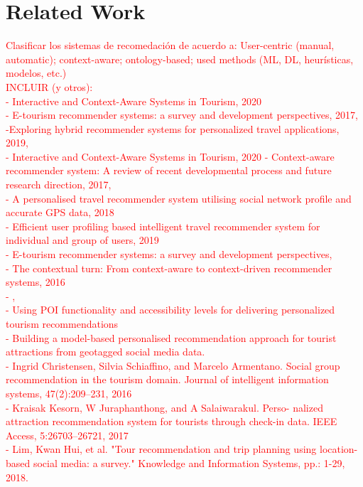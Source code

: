 \section{Related Work}

\textcolor{red}{Clasificar los sistemas de recomedación de acuerdo a: User-centric (manual, automatic); context-aware; ontology-based; used methods (ML, DL, heurísticas, modelos, etc.)\\
INCLUIR (y otros):\\
- Interactive and Context-Aware Systems in Tourism, 2020 \cite{jannach2020interactive}\\
- E-tourism recommender systems: a survey and development perspectives, 2017, \cite{artemenko2017tourism}\\
-Exploring hybrid recommender systems for personalized travel applications, 2019, \cite{logesh2019exploring}\\
- Interactive and Context-Aware Systems in Tourism, 2020
- Context-aware recommender system: A review of recent developmental process and future research direction, 2017,\\ 
- A personalised travel recommender system utilising social network profile and accurate GPS data, 2018\\
- Efficient user profiling based intelligent travel recommender system for individual and group of users, 2019\\
- E-tourism recommender systems: a survey and development perspectives,\\
- The contextual turn: From context-aware to context-driven recommender systems, 2016\\
- \cite{adomavicius2011context,rajaonarivo2019recommendation},\\
- Using POI functionality and accessibility levels for delivering personalized tourism recommendations\\
- Building a model-based personalised recommendation approach
for tourist attractions from geotagged social media data.\\
- Ingrid Christensen, Silvia Schiaffino, and Marcelo Armentano.
Social group recommendation in the tourism domain. Journal
of intelligent information systems, 47(2):209–231, 2016\\
- Kraisak Kesorn, W Juraphanthong, and A Salaiwarakul. Perso-
nalized attraction recommendation system for tourists through
check-in data. IEEE Access, 5:26703–26721, 2017\\
- Lim, Kwan Hui, et al. "Tour recommendation and trip planning using location-based social media: a survey."
Knowledge and Information Systems, pp.: 1-29, 2018.
}




